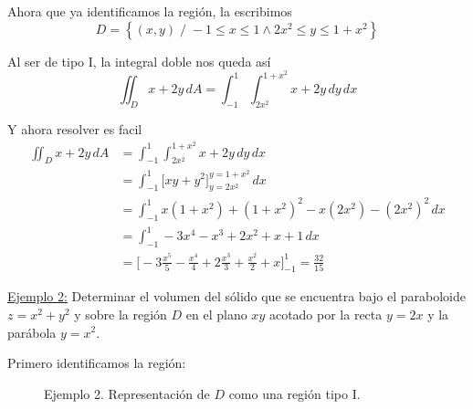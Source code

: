 \documentclass[12pt]{article}
\begin{document}
Ahora que ya identificamos la región, la escribimos
\[
  D=\left\{(x,y) \;/\; -1\leq x\leq 1 \land 2x^2\leq y\leq 1+x^2\right\}
\]

Al ser de tipo I, la integral doble nos queda así
\[
  \iint_{D} x+2y \,dA = \int_{-1}^{1} \int_{2x^2}^{1+x^2} x+2y \,dy\,dx
\]

Y ahora resolver es facil
\begin{align*}
  \iint_{D} x+2y \,dA &= \int_{-1}^{1} \int_{2x^2}^{1+x^2} x+2y \,dy\,dx \\
   &= \int_{-1}^{1} \Bigg[xy+y^2\Bigg]_{y=2x^2}^{y=1+x^2} \,dx\\
    &= \int_{-1}^{1} x\left(1+x^2\right)+\left(1+x^2\right)^2 - x\left(2x^2\right)-\left(2x^2\right)^2 \,dx\\
    &= \int_{-1}^{1} -3x^4-x^3+2x^2+x+1 \,dx\\
     &= \Bigg[-3\frac{x^5}{5}-\frac{x^4}{4}+2\frac{x^3}{3}+\frac{x^2}{2}+x\Bigg]_{-1}^{1} = \frac{32}{15}
\end{align*}

\underline{Ejemplo 2:} Determinar el volumen del sólido que se encuentra bajo el paraboloide $ z=x^2+y^2 $ y sobre la región $ D $ en el plano $ xy $ acotado por la recta $ y=2x $ y la parábola $ y=x^2 $.

Primero identificamos la región:
\begin{figure}[H]
  \centering
  {\large }
  \caption{Ejemplo 2. Representación de $ D $ como una región tipo I.}
  \label{grf:integral-doble-ej2}
\end{figure}
\end{document}
